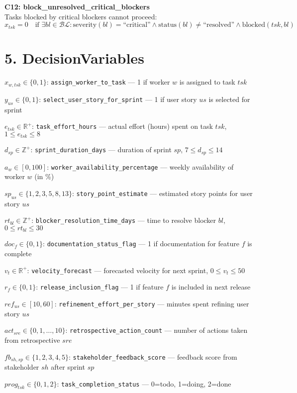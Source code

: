 \documentclass[12pt]{article}
\begin{document}
    \item \textbf{C12: block\_unresolved\_critical\_blockers} \\
    Tasks blocked by critical blockers cannot proceed:
    \[
    x_{tsk} = 0 \quad \text{if } \exists bl \in \mathcal{BL} : \text{severity}(bl) = \text{``critical''} \land \text{status}(bl) \neq \text{``resolved''} \land \text{blocked}(tsk, bl)
    \]

\section{5. DecisionVariables}
\item $ x_{w,tsk} \in \{0,1\} $: \texttt{assign\_worker\_to\_task} — 1 if worker $ w $ is assigned to task $ tsk $
    \item $ y_{us} \in \{0,1\} $: \texttt{select\_user\_story\_for\_sprint} — 1 if user story $ us $ is selected for sprint
    \item $ e_{tsk} \in \mathbb{R}^+ $: \texttt{task\_effort\_hours} — actual effort (hours) spent on task $ tsk $, $ 1 \leq e_{tsk} \leq 8 $
    \item $ d_{sp} \in \mathbb{Z}^+ $: \texttt{sprint\_duration\_days} — duration of sprint $ sp $, $ 7 \leq d_{sp} \leq 14 $
    \item $ a_w \in [0,100] $: \texttt{worker\_availability\_percentage} — weekly availability of worker $ w $ (in \%)
    \item $ sp_{us} \in \{1,2,3,5,8,13\} $: \texttt{story\_point\_estimate} — estimated story points for user story $ us $
    \item $ rt_{bl} \in \mathbb{Z}^+ $: \texttt{blocker\_resolution\_time\_days} — time to resolve blocker $ bl $, $ 0 \leq rt_{bl} \leq 30 $
    \item $ doc_f \in \{0,1\} $: \texttt{documentation\_status\_flag} — 1 if documentation for feature $ f $ is complete
    \item $ v_{t} \in \mathbb{R}^+ $: \texttt{velocity\_forecast} — forecasted velocity for next sprint, $ 0 \leq v_t \leq 50 $
    \item $ r_{f} \in \{0,1\} $: \texttt{release\_inclusion\_flag} — 1 if feature $ f $ is included in next release
    \item $ ref_{us} \in [10,60] $: \texttt{refinement\_effort\_per\_story} — minutes spent refining user story $ us $
    \item $ act_{sre} \in \{0,1,\dots,10\} $: \texttt{retrospective\_action\_count} — number of actions taken from retrospective $ sre $
    \item $ fb_{sh,sp} \in \{1,2,3,4,5\} $: \texttt{stakeholder\_feedback\_score} — feedback score from stakeholder $ sh $ after sprint $ sp $
    \item $ prog_{tsk} \in \{0,1,2\} $: \texttt{task\_completion\_status} — 0=todo, 1=doing, 2=done
\end{document}
